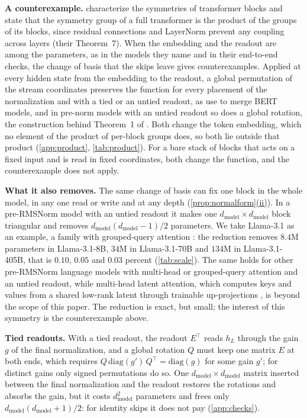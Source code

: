 \documentclass[10pt]{article}
\theoremstyle{definition}
\theoremstyle{remark}
\newcommand{\dm}{d_{\mathrm{model}}}
\newcommand{\para}[1]{\smallskip\noindent\textbf{#1}\hspace{0.5em}}
\DeclareRobustCommand{\cpref}[2]{\hyperref[#1:#2]{\cref*{#1}(#2)}}
\begin{document}
\para{A counterexample.} \citet{wang2025gauge} characterize the symmetries of transformer blocks and state that the symmetry group of a full transformer is the product of the groups of its blocks, since residual connections and LayerNorm prevent any coupling across layers (their Theorem~7). When the embedding and the readout are among the parameters, as in the models they name and in their end-to-end checks, the change of basis that the skips leave gives counterexamples. Applied at every hidden state from the embedding to the readout, a global permutation of the stream coordinates preserves the function for every placement of the normalization and with a tied or an untied readout, as \citet[Section~3.3]{verma2024merging} use to merge BERT models, and in pre-norm models with an untied readout so does a global rotation, the construction behind Theorem~1 of \citet{ashkboos2024slicegpt}. Both change the token embedding, which no element of the product of per-block groups does, so both lie outside that product (\cref{app:product}, \cref{tab:product}). For a bare stack of blocks that acts on a fixed input and is read in fixed coordinates, both change the function, and the counterexample does not apply.

\para{What it also removes.} The same change of basis can fix one block in the whole model, in any one read or write and at any depth (\cpref{prop:normalform}{ii}). In a pre-RMSNorm model with an untied readout it makes one $\dm \times \dm$ block triangular and removes $\dm(\dm-1)/2$ parameters. We take Llama-3.1 as an example, a family with grouped-query attention \citep{grattafiori2024llama3}: the reduction removes $8.4$M parameters in Llama-3.1-8B, $34$M in Llama-3.1-70B and $134$M in Llama-3.1-405B, that is $0.10$, $0.05$ and $0.03$ percent (\cref{tab:scale}). The same holds for other pre-RMSNorm language models with multi-head or grouped-query attention and an untied readout, while multi-head latent attention, which computes keys and values from a shared low-rank latent through trainable up-projections \citep[Section~2.1.1]{deepseek2024v3}, is beyond the scope of this paper. The reduction is exact, but small; the interest of this symmetry is the counterexample above.

\para{Tied readouts.} With a tied readout, the readout $E^\top$ reads $h_L$ through the gain $g$ of the final normalization, and a global rotation $Q$ must keep one matrix $E$ at both ends, which requires $Q\,\mathrm{diag}(g')\,Q^\top = \mathrm{diag}(g)$ for some gain $g'$; for distinct gains only signed permutations do so. One $\dm \times \dm$ matrix inserted between the final normalization and the readout restores the rotations and absorbs the gain, but it costs $\dm^2$ parameters and frees only $\dm(\dm+1)/2$: for identity skips it does not pay (\cref{app:checks}).
\end{document}
